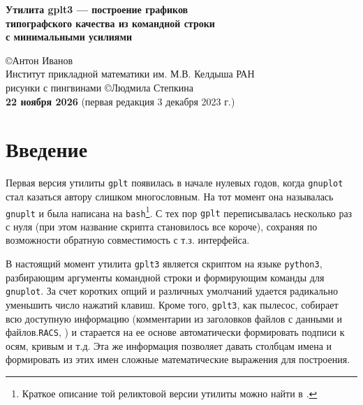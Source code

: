 \documentclass[12pt]{article}
\def\gplt{{\tt gplt}}
\def\gnuplot{{\tt gnuplot}}
\def\python{{\tt python3}}
\def\RACS{{\tt RACS}}
\begin{document}
\begin{center}
 { \Large\bf
Утилита gplt3 --- построение графиков\\ типографского качества из командной строки\\ с минимальными усилиями\\[5mm]
}

\large
\copyright Антон Иванов\\[2mm] 
\normalsize
Институт прикладной математики им. М.В. Келдыша РАН\\[2mm]

\small рисунки с пингвинами \copyright Людмила Степкина\\[3mm]
{\bf 22 ноября 2026} (первая редакция 3 декабря 2023 г.)\\[7mm]

\end{center}

\vspace{-2cm}

\tableofcontents

\newpage
\section{Введение}
\begin{figure}
  \vphantom{.}
  \vspace{-1.5cm}

\end{figure}
Первая версия утилиты \gplt{} появилась в начале нулевых годов, когда \gnuplot{} стал казаться автору слишком многословным.
На тот момент она называлась \verb'gnuplt' и была написана на \verb'bash'\footnote{Краткое описание той реликтовой версии утилиты можно найти в \cite{aiv:racs2007}.}.
С тех пор \gplt{} переписывалась несколько раз с нуля (при этом название скрипта становилось все короче),
сохраняя по возможности обратную совместимость с т.з. интерфейса.  

\def\gplt{{\tt gplt3}}

В настоящий момент утилита \gplt{} является скриптом на языке \python, разбирающим аргументы командной строки и формирующим команды для \gnuplot.
За счет коротких опций и различных умолчаний удается радикально уменьшить число нажатий клавиш. Кроме того, \gplt{}, как пылесос, собирает всю доступную информацию
(комментарии из заголовков файлов с данными и файлов.\RACS, \cite{aiwlib:SR:PP2018})
и старается на ее основе автоматически формировать подписи к осям, кривым и т.д.
Эта же информация позволяет давать столбцам имена и формировать из этих имен сложные математические выражения для построения.
\end{document}
